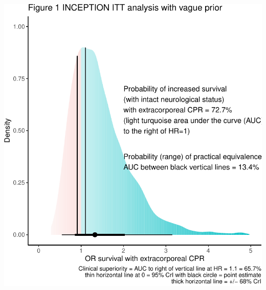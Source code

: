\documentclass[
  super,
  preprint,
  3p]{elsarticle}
\begin{document}
\includegraphics{manuscript_files/figure-pdf/fig1-1.pdf}

\newpage
\end{document}
